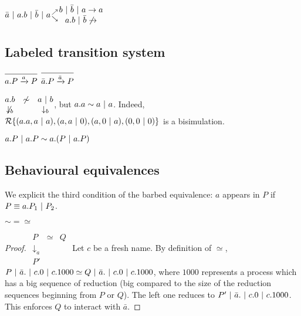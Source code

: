 \begin{ex}
	$\bar a \ |\  a.b \ |\  \bar b \ |\  a {\nearrow \atop \searrow} \begin{matrix} b\ |\  \bar b \ |\  a \rightarrow a \\ a.b \ |\  \bar b \not\rightarrow\end{matrix}$
\end{ex}

\subsection{Labeled transition system}

$\infer{a.P \xrightarrow a P}{}$ $\infer{\bar a.P \xrightarrow {\bar a} P}{}$

\begin{ex}
	$\begin{matrix}a.b &\not \sim & a \ |\  b \\ \not \downarrow_{b} & & \downarrow_{b} \end{matrix}$, but $a.a \sim a\ |\  a$. 
	Indeed, $\mathcal R \{(a.a, a \ |\  a), (a, a \ |\  0), (a, 0\ |\  a), (0, 0\ |\  0)\}$ is a bisimulation.
\end{ex}

\begin{rmk}
	$a.P\ |\  a.P \sim a.(P \ |\  a.P)$
\end{rmk}

\subsection{Behavioural equivalences}

We explicit the third condition of the barbed equivalence: $a$ appears in $P$ if $P \equiv a.P_{1} \ |\  P_{2}$.

\begin{theo}
	$\sim = \simeq$
\end{theo}
\begin{proof}
	$\begin{matrix} P & \simeq & Q \\ \downarrow_{a} & & \\ P' & & \end{matrix}$
	Let $c$ be a fresh name. 
	By definition of $\simeq$, $P\ |\  \bar a. \ |\  c.0 \ |\  c.1000 \simeq Q\ |\  \bar a. \ |\  c.0 \ |\  c.1000$, where $1000$ represents a process which has a big sequence of reduction (big compared to the size of the reduction sequences beginning from $P$ or $Q$).%
	The left one reduces to $P' \ |\  \bar a. \ |\  c.0 \ |\  c.1000$. This enforces $Q$ to interact with $\bar a$. %
\end{proof}

